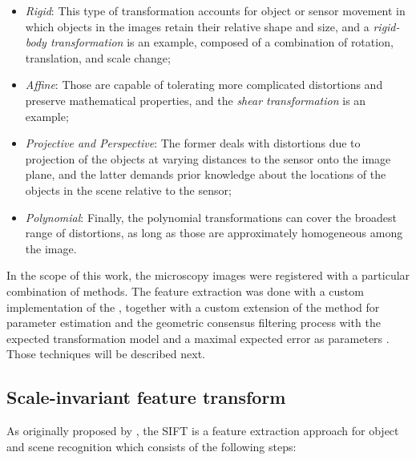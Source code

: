 \begin{itemize}
    \item \emph{Rigid}: This type of transformation accounts for object or sensor movement in which objects in the images retain their relative shape and size, and a \emph{rigid-body transformation} is an example, composed of a combination of rotation, translation, and scale change; 
    
    \item \emph{Affine}: Those are capable of tolerating more complicated distortions and preserve mathematical properties, and the \emph{shear transformation} is an example;
    
    \item \emph{Projective and Perspective}: The former deals with distortions due to projection of the objects at varying distances to the sensor onto the image plane, and the latter demands prior knowledge about the locations of the objects in the scene relative to the sensor;
    
    \item \emph{Polynomial}: Finally, the polynomial transformations can cover the broadest range of distortions, as long as those are approximately homogeneous among the image.
\end{itemize}

In the scope of this work, the microscopy images were registered with a particular combination of methods. The feature extraction was done with a custom implementation of the , together with a custom extension of the  method for parameter estimation and the geometric consensus filtering process with the expected transformation model and a maximal expected error as parameters \cite{saalfeld2019computational}. Those techniques will be described next.

\subsection{Scale-invariant feature transform}

As originally proposed by , the SIFT is a feature extraction approach for object and scene recognition which consists of the following steps:

